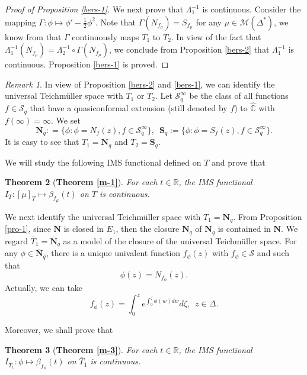 \documentclass[11pt]{amsart}
\newtheorem{theorem}{Theorem}[section]
\theoremstyle{remark}
\newtheorem{remark}[theorem]{Remark}
\theoremstyle{claim}
\theoremstyle{definition}
\theoremstyle{problem}
\theoremstyle{conjecture}
\theoremstyle{question}
\numberwithin{equation}{section}
\begin{document}
\begin{proof}[Proof of Proposition \ref{bers-1}]
We next prove that $\Lambda_1^{-1}$ is continuous.  Consider the mapping $\Gamma: \phi \mapsto \phi'-\frac{1}{2}\phi^2$. Note that $\Gamma(N_{f_{\mu}})=S_{f_{\mu}}$ for any $\mu\in \mathcal{M}(\Delta^*)$,  we know from \cite{Zhur} that $\Gamma$ continuously maps $T_1$ to $T_2$. In view of  the fact that $\Lambda_1^{-1}(N_{f_{\mu}})=\Lambda_2^{-1} \circ \Gamma(N_{f_{\mu}})$, we conclude from Proposition \ref{bers-2} that 
$\Lambda_1^{-1}$ is continuous. Proposition \ref{bers-1} is proved. 
\end{proof}

\begin{remark}
In view of Proposition \ref{bers-2} and \ref{bers-1}, we can identify the universal Teichm\"uller space with $T_1$ or $T_2$.
Let $\mathcal{S}_q^{\infty}$ be the class of all functions $f\in \mathcal{S}_q$ that have a quasiconformal extension (still denoted by $f$) to $\widehat{\mathbb{C}}$ with $f(\infty)=\infty$. We set
$$\mathbf{N}_q: =\{\phi: \phi=N_f(z), f\in \mathcal{S}_q^{\infty}\}, \,\,\, \mathbf{S}_q:=\{\phi: \phi=S_f(z), f\in \mathcal{S}_q^{\infty}\}.$$
It is easy to see that $T_1=\mathbf{N}_q$ and $T_2= \mathbf{S}_q$.
\end{remark}

We will study the following IMS functional defined on $T$ and prove that
\begin{theorem}[{\bf Theorem \ref{m-1}}]\label{th-1}
For each $t\in \mathbb{R}$, the IMS functional $I_{{T}}: [\mu]_T  \mapsto \beta_{f_{\mu}}(t)$ on $T$ is continuous.
\end{theorem}

We next identify the universal Teichm\"uller space with $T_1=\mathbf{N}_q$. From Proposition \ref{pro-1}, since $\mathbf{N}$ is closed in $E_1$, then the closure $\overline{\mathbf{N}}_q$ of $\mathbf{N}_q$ is contained in $\mathbf{N}$.  We regard  $\overline{T}_1=\overline{\mathbf{N}}_q$ as a model of the closure of the universal Teichm\"uller space.
For any $\phi \in \overline{\mathbf{N}}_q$, there is a unique univalent function $f_{\phi}(z)$ with $f_{\phi}\in \mathcal{S}$ and such that
$$\phi(z)=N_{f_{\phi}}(z).$$ Actually,  we can take 
\begin{equation}\label{exa}f_{\phi}(z)=\int_{0}^{z} e^{\int_{0}^{\zeta}\phi(w) dw}d\zeta, \,\,\,z\in\Delta.\end{equation}

Moreover, we shall prove that
\begin{theorem}[{\bf Theorem \ref{m-3}}]\label{th-2}
For each $t\in \mathbb{R}$, the IMS functional $I_{\overline{T}_1}: \phi  \mapsto  \beta_{f_{\phi}}(t)$ on $\overline{T}_1$ is continuous.
\end{theorem}
\end{document}
